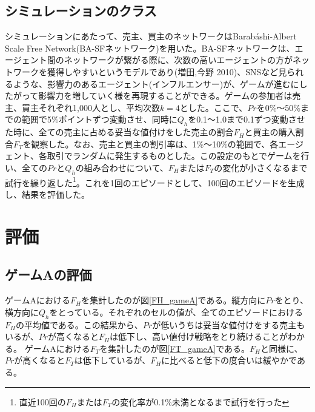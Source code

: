 \documentclass[a4paper,fontsize=11pt,report,notitlepage,line_length=38zw,number_of_lines=40,dvipdfmx]{jlreq}
\begin{document}
\section{シミュレーションのクラス}
シミュレーションにあたって、売主、買主のネットワークはBarab\'{a}shi-Albert Scale Free Network(BA-SFネットワーク)を用いた。BA-SFネットワークは、エージェント間のネットワークが繋がる際に、次数の高いエージェントの方がネットワークを獲得しやすいというモデルであり(増田,今野 2010)\cite{masuda2010}、SNSなど見られるような、影響力のあるエージェント(インフルエンサー)が、ゲームが進むにしたがって影響力を増していく様を再現することができる。ゲームの参加者は売主、買主それぞれ1,000人とし、平均次数$k=4$とした。ここで、$Pr$を0\%〜50\%までの範囲で5\%ポイントずつ変動させ、同時に$Q_h$を0.1〜1.0まで0.1ずつ変動させた時に、全ての売主に占める妥当な値付けをした売主の割合$F_H$と買主の購入割合$F_T$を観察した。なお、売主と買主の割引率は、1\%〜10\%の範囲で、各エージェント、各取引でランダムに発生するものとした。この設定のもとでゲームを行い、全ての$Pr$と$Q_h$の組み合わせについて、$F_H$または$F_T$の変化が小さくなるまで試行を繰り返した\footnote{直近100回の$F_H$または$F_T$の変化率が0.1\%未満となるまで試行を行った}。これを1回のエピソードとして、100回のエピソードを生成し、結果を評価した。

\chapter{評価}
\section{ゲームAの評価}
ゲームAにおける$F_H$を集計したのが図\ref{FH_gameA}である。縦方向に$Pr$をとり、横方向に$Q_h$をとっている。それぞれのセルの値が、全てのエピソードにおける$F_H$の平均値である。この結果から、$Pr$が低いうちは妥当な値付けをする売主もいるが、$Pr$が高くなると$F_H$は低下し、高い値付け戦略をとり続けることがわかる。
ゲームAにおける$F_T$を集計したのが図\ref{FT_gameA}である。$F_H$と同様に、$Pr$が高くなると$F_T$は低下しているが、$F_H$に比べると低下の度合いは緩やかである。
\end{document}
